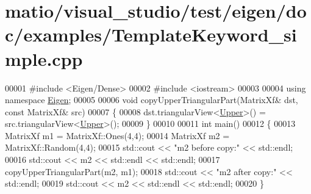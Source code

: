 \hypertarget{matio_2visual__studio_2test_2eigen_2doc_2examples_2_template_keyword__simple_8cpp_source}{}\section{matio/visual\+\_\+studio/test/eigen/doc/examples/\+Template\+Keyword\+\_\+simple.cpp}
\label{matio_2visual__studio_2test_2eigen_2doc_2examples_2_template_keyword__simple_8cpp_source}

\begin{DoxyCode}
00001 \textcolor{preprocessor}{#include <Eigen/Dense>}
00002 \textcolor{preprocessor}{#include <iostream>}
00003 
00004 \textcolor{keyword}{using namespace }\hyperlink{namespace_eigen}{Eigen};
00005 
00006 \textcolor{keywordtype}{void} copyUpperTriangularPart(MatrixXf& dst, \textcolor{keyword}{const} MatrixXf& src)
00007 \{
00008   dst.triangularView<\hyperlink{group__enums_gga39e3366ff5554d731e7dc8bb642f83cda6bcb58be3b8b8ec84859ce0c5ac0aaec}{Upper}>() = src.triangularView<\hyperlink{group__enums_gga39e3366ff5554d731e7dc8bb642f83cda6bcb58be3b8b8ec84859ce0c5ac0aaec}{Upper}>();
00009 \}
00010 
00011 \textcolor{keywordtype}{int} main()
00012 \{
00013   MatrixXf m1 = MatrixXf::Ones(4,4);
00014   MatrixXf m2 = MatrixXf::Random(4,4);
00015   std::cout << \textcolor{stringliteral}{"m2 before copy:"} << std::endl;
00016   std::cout << m2 << std::endl << std::endl;
00017   copyUpperTriangularPart(m2, m1);
00018   std::cout << \textcolor{stringliteral}{"m2 after copy:"} << std::endl;
00019   std::cout << m2 << std::endl << std::endl;
00020 \}
\end{DoxyCode}

